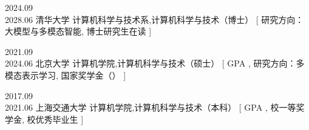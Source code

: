 

\Edu
  {2024.09\\[2pt]2028.06}                              %
  {清华大学}                                            %
  {计算机科学与技术系\sep 计算机科学与技术（博士）}      %
  [%
    研究方向：大模型与多模态智能\sep
    博士研究生在读%
  ]

\Edu
  {2021.09\\[2pt]2024.06}
  {北京大学}
  {计算机学院\sep 计算机科学与技术（硕士）}
  [%
    GPA \sep
    研究方向：多模态表示学习\sep
    国家奖学金（）%
  ]

\Edu
  {2017.09\\[2pt]2021.06}
  {上海交通大学}
  {计算机学院\sep 计算机科学与技术（本科）}
  [%
    GPA \sep
    校一等奖学金\sep
    校优秀毕业生%
  ]
